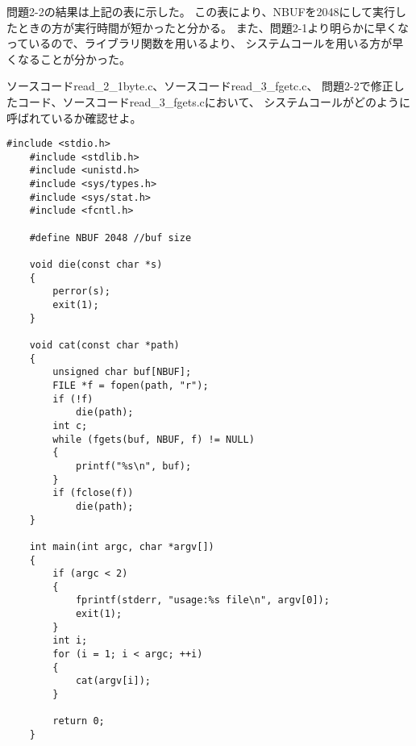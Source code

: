 \documentclass[12pt]{jarticle}
\begin{document}
問題2-2の結果は上記の表に示した。
この表により、NBUFを2048にして実行したときの方が実行時間が短かったと分かる。
また、問題2-1より明らかに早くなっているので、ライブラリ関数を用いるより、
システムコールを用いる方が早くなることが分かった。

\clearpage
\begin{itembox}[l]{}
    ソースコードread\_2\_1byte.c、ソースコードread\_3\_fgetc.c、
    問題2-2で修正したコード、ソースコードread\_3\_fgets.cにおいて、
    システムコールがどのように呼ばれているか確認せよ。
\end{itembox}
\begin{lstlisting}[caption=read\_3\_fgets.c,label=read4, style=lstC]
    #include <stdio.h>
    #include <stdlib.h>
    #include <unistd.h>
    #include <sys/types.h>
    #include <sys/stat.h>
    #include <fcntl.h>
    
    #define NBUF 2048 //buf size
    
    void die(const char *s)
    {
        perror(s);
        exit(1);
    }
    
    void cat(const char *path)
    {
        unsigned char buf[NBUF];
        FILE *f = fopen(path, "r");
        if (!f)
            die(path);
        int c;
        while (fgets(buf, NBUF, f) != NULL)
        {
            printf("%s\n", buf);
        }
        if (fclose(f))
            die(path);
    }
    
    int main(int argc, char *argv[])
    {
        if (argc < 2)
        {
            fprintf(stderr, "usage:%s file\n", argv[0]);
            exit(1);
        }
        int i;
        for (i = 1; i < argc; ++i)
        {
            cat(argv[i]);
        }
    
        return 0;
    }
\end{lstlisting}
\clearpage
{}
\end{document}

